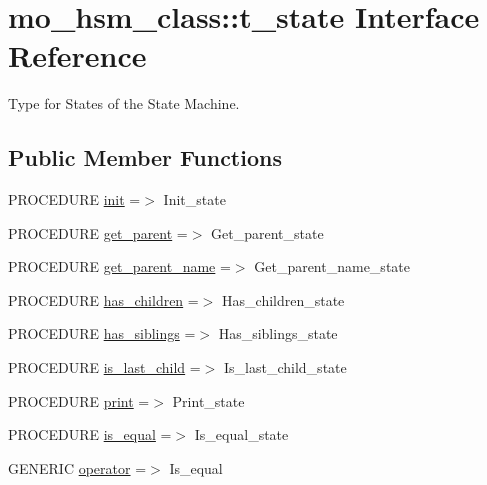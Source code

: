 \hypertarget{structmo__hsm__class_1_1t__state}{}\section{mo\+\_\+hsm\+\_\+class\+:\+:t\+\_\+state Interface Reference}
\label{structmo__hsm__class_1_1t__state}


Type for States of the State Machine.  


\subsection*{Public Member Functions}
\begin{DoxyCompactItemize}
\item 
P\+R\+O\+C\+E\+D\+U\+R\+E \hyperlink{structmo__hsm__class_1_1t__state_a55c5bf0749d95419bb6575efe08893d0}{init} =$>$ Init\+\_\+state
\item 
P\+R\+O\+C\+E\+D\+U\+R\+E \hyperlink{structmo__hsm__class_1_1t__state_ac338df5a88b313958a07dc223ab67263}{get\+\_\+parent} =$>$ Get\+\_\+parent\+\_\+state
\item 
P\+R\+O\+C\+E\+D\+U\+R\+E \hyperlink{structmo__hsm__class_1_1t__state_a2e607c4d73468952279a2d9363ed8ba3}{get\+\_\+parent\+\_\+name} =$>$ Get\+\_\+parent\+\_\+name\+\_\+state
\item 
P\+R\+O\+C\+E\+D\+U\+R\+E \hyperlink{structmo__hsm__class_1_1t__state_aa0d2a17ba461c7e3c0961041bfc0833b}{has\+\_\+children} =$>$ Has\+\_\+children\+\_\+state
\item 
P\+R\+O\+C\+E\+D\+U\+R\+E \hyperlink{structmo__hsm__class_1_1t__state_a083ef1cd9966d01583c7453d169ede97}{has\+\_\+siblings} =$>$ Has\+\_\+siblings\+\_\+state
\item 
P\+R\+O\+C\+E\+D\+U\+R\+E \hyperlink{structmo__hsm__class_1_1t__state_acec58eb217ff3a42148b0544bb9e7488}{is\+\_\+last\+\_\+child} =$>$ Is\+\_\+last\+\_\+child\+\_\+state
\item 
P\+R\+O\+C\+E\+D\+U\+R\+E \hyperlink{structmo__hsm__class_1_1t__state_ad6dd8ae59eaafa2b9649d6b02c945a05}{print} =$>$ Print\+\_\+state
\item 
P\+R\+O\+C\+E\+D\+U\+R\+E \hyperlink{structmo__hsm__class_1_1t__state_a26d0489af1742825f7dcf803d87d3f72}{is\+\_\+equal} =$>$ Is\+\_\+equal\+\_\+state
\item 
G\+E\+N\+E\+R\+I\+C \hyperlink{structmo__hsm__class_1_1t__state_a00fc085f4473008b9fc00f06dae76e97}{operator} =$>$ Is\+\_\+equal
\end{DoxyCompactItemize}
